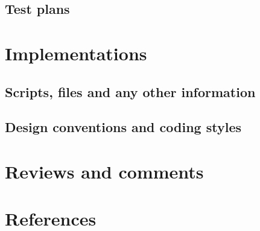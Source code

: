 \documentclass[a4paper,11pt]{article}
\begin{document}
\subsection{Test plans}

\section{Implementations}

\subsection{Scripts, files and any other information}

\subsection{Design conventions and coding styles}

\section{Reviews and comments}

\section{References}
\end{document}
